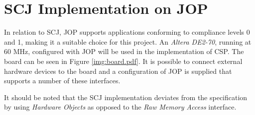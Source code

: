 \section{SCJ Implementation on JOP} %
\label{sec:scj_implementation_on_jop}
In relation to SCJ, JOP supports applications conforming to compliance levels 0 and 1, making it a suitable choice for this project. An \textit{Altera DE2-70}, running at 60 MHz, configured with JOP will be used in the implementation of CSP. The board can be seen in Figure \ref{img:board.pdf}. It is possible to connect external hardware devices to the board and a configuration of JOP is supplied that supports a number of these interfaces.

It should be noted that the SCJ implementation deviates from the specification by using \textit{Hardware Objects}\cite{Schoeberl:2011:HAL:2043662.2043666, Schoeberl:2008:HOJ:1371608.1372849} as opposed to the \textit{Raw Memory Access} interface.

